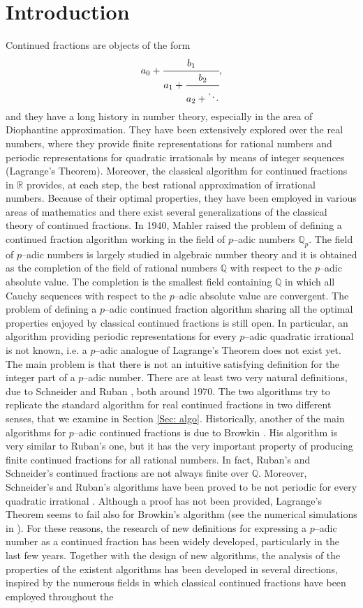 \documentclass[12pt, reqno]{amsart}
\theoremstyle{plain}
\theoremstyle{definition}
\begin{document}
\section{Introduction}
Continued fractions are objects of the form \begin{equation}
a_0+\cfrac{b_1}{a_1+\cfrac{b_2}{a_2+\ddots}},
\end{equation}
and they have a long history in number theory, especially in the area of Diophantine approximation. They have been extensively explored over the real numbers, where they provide finite representations for rational numbers and periodic representations for quadratic irrationals by means of integer sequences (Lagrange's Theorem). Moreover, the classical algorithm for continued fractions in $\mathbb{R}$ provides, at each step, the best rational approximation of irrational numbers. Because of their optimal properties, they have been employed in various areas of mathematics and there exist several generalizations of the classical theory of continued fractions. In 1940, Mahler \cite{MAH} raised the problem of defining a continued fraction algorithm working in the field of $p$--adic numbers $\mathbb{Q}_p$. The field of $p$--adic numbers is largely studied in algebraic number theory and it is obtained as the completion of the field of rational numbers $\mathbb{Q}$ with respect to the $p$--adic absolute value. The completion is the smallest field containing $\mathbb{Q}$ in which all Cauchy sequences with respect to the $p$--adic absolute value are convergent. The problem of defining a $p$--adic continued fraction algorithm sharing all the optimal properties enjoyed by classical continued fractions is still open. In particular, an algorithm providing periodic representations for every $p$--adic quadratic irrational is not known, i.e. a $p$--adic analogue of Lagrange's Theorem does not exist yet. The main problem is that there is not an intuitive satisfying definition for the integer part of a $p$--adic number. There are at least two very natural definitions, due to Schneider \cite{SCH} and Ruban \cite{RUB}, both around 1970. The two algorithms try to replicate the standard algorithm for real continued fractions in two different senses, that we examine in Section \ref{Sec: algo}. Historically, another of the main algorithms for $p$--adic continued fractions is due to Browkin \cite{BI}. His algorithm is very similar to Ruban's one, but it has the very important property of producing finite continued fractions for all rational numbers. In fact, Ruban's and Schneider's continued fractions are not always finite over $\mathbb{Q}$. Moreover, Schneider's and Ruban's algorithms have been proved to be not periodic for every quadratic irrational \cite{TIL,CVZ}. Although a proof has not been provided, Lagrange's Theorem seems to fail also for Browkin's algorithm (see the numerical simulations in \cite{MR}). For these reasons, the research of new definitions for expressing a $p$--adic number as a continued fraction has been widely developed, particularly in the last few years. Together with the design of new algorithms, the analysis of the properties of the existent algorithms has been developed in several directions, inspired by the numerous fields in which classical continued fractions have been employed throughout the 
\end{document}
